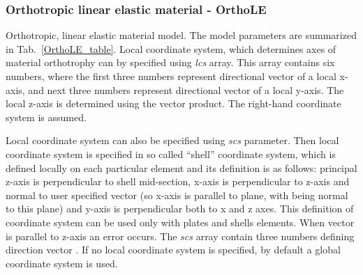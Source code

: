 \documentclass[a4paper]{article}
\newcommand{\param}[1]{{\it #1}}
\begin{document}
\subsubsection{Orthotropic linear elastic material - OrthoLE}
\label{OrthoLE}
Orthotropic, linear elastic  material model. The model parameters are summarized
in Tab.~\ref{OrthoLE_table}.
Local coordinate system, which determines axes of material orthotrophy
can by specified using \param{lcs} array. This array contains six numbers,
where the first three numbers represent directional vector of a local x-axis,
and next three numbers represent directional vector of a local y-axis.
The local z-axis is determined using the vector product.
The right-hand coordinate system is assumed.

Local coordinate system
can also be specified using \param{scs} parameter. Then local coordinate
system is specified in so called ``shell''
coordinate system, which is defined locally on each particular element
and its definition is as follows: principal z-axis is perpendicular to
shell mid-section, x-axis is perpendicular to z-axis and normal to
user specified vector (so x-axis is parallel to plane, with  being
normal to this plane) and y-axis is perpendicular both to x and z
axes. This definition of coordinate system can be used only with plates
and shells elements.
When vector  is parallel to z-axis an error occurs. The \param{scs} array contain three numbers
defining direction vector . If no local coordinate system is
specified, by default a global coordinate system is used.
\end{document}
